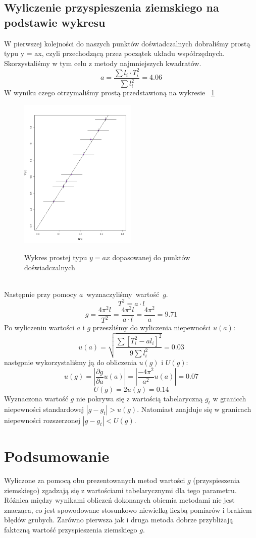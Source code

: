 \documentclass{fizraport}
\begin{document}
\subsection{Wyliczenie przyspieszenia ziemskiego na podstawie wykresu}
W pierwszej kolejności do naszych punktów doświadczalnych dobraliśmy prostą typu y = ax, czyli przechodzącą przez początek
układu współrzędnych. Skorzystaliśmy w tym celu z metody najmniejszych kwadratów.
\[ a = \frac{\sum{l_i \cdot T_i^2}}{\sum{l_i^2}}=4.06\]
W wyniku czego otrzymaliśmy prostą przedstawioną na wykresie~ \figurename{\ref{fig:w4}}
\begin{figure}[htbp]
 \centering
  \caption{Wykres prostej typu $y = ax$ dopasowanej do punktów doświadczalnych}
 \includegraphics[width=0.5\textwidth,keepaspectratio=true]{wykres3.pdf}
 \label{fig:w4}
\end{figure}
%
\\
Następnie przy pomocy $a$~wyznaczyliśmy~wartość~$g$.
\[T^2=a \cdot l\]
\[g=\frac{4\pi^2l}{T^2}=\frac{4\pi^2l}{a\cdot l}=\frac{4\pi^2}{a}=9.71\]
Po wyliczeniu wartości $a$ i $g$ przeszliśmy do wyliczenia niepewności $u(a)$:
\[u(a)=\sqrt{\frac{\sum{[T^2_i-al_i]^2}}{9\sum{l_i^2}}}=0.03\]
 następnie wykorzystaliśmy ją do obliczenia $u(g)$ i $U(g)$:
\[u(g) = \left| \frac{\partial g}{\partial a}u(a)\right|=\left| \frac{-4\pi^2}{a^2}u(a)\right|=0.07\]
\[U(g)=2u(g)=0.14\]
Wyznaczona wartość $g$ nie pokrywa się z wartością tabelaryczną $g_t$ w granicch niepewności standardowej $|g-g_t|>u(g)$. Natomiast znajduje się w granicach niepewności rozszerzonej $|g-g_t|<U(g)$.

\section{Podsumowanie}
Wyliczone za pomocą obu prezentowanych metod wartości $g$ (przyspieszenia ziemskiego) zgadzają się z wartościami tabelarycznymi dla tego parametru. Różnica między wynikami obliczeń dokonanych obiemia metodami nie jest znacząca, co jest spowodowane stosunkowo niewielką liczbą pomiarów i brakiem błędów grubych.
Zarówno pierwsza jak i druga metoda dobrze przybliżają faktczną wartość przyspieszenia ziemskiego $g$.
\end{document}
